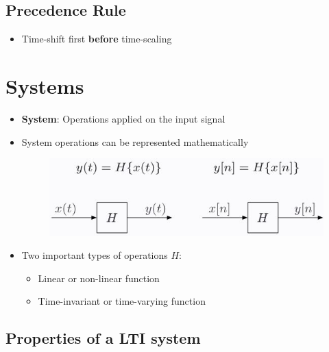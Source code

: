 \documentclass[conference]{IEEEtran}
\begin{document}
\subsection{Precedence Rule}
\begin{itemize}
  \item Time-shift first \textbf{before} time-scaling
\end{itemize}

\section{Systems}

\begin{itemize}
  \item \textbf{System}: Operations applied on the input signal
  \item System operations can be represented mathematically 
  \begin{figure} [h!]
      \centering
      \includegraphics[scale=0.5]{Ex1.JPG}
  \end{figure}
  \item Two important types of operations $H$:
  \begin{itemize}
    \item Linear or non-linear function
    \item Time-invariant or time-varying function
  \end{itemize}
\end{itemize}

\pagebreak
\subsection{Properties of a LTI system}
\end{document}
